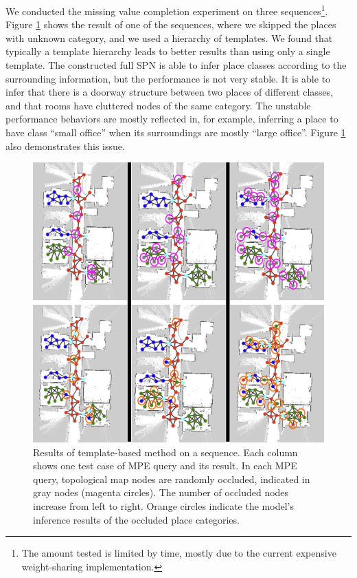 \documentclass[10pt, titlepage]{article}
\theoremstyle{definition}
\begin{document}
We conducted the missing value completion experiment on three sequences\footnote{The amount tested is limited by time, mostly due to the current expensive weight-sharing implementation.}. Figure \ref{fig:tmpl_result} shows the result of one of the sequences, where we skipped the places with unknown category, and we used a hierarchy of templates. We found that typically a template hierarchy leads to better results than using only a single template.
The constructed full SPN is able to infer place classes according to the surrounding information, but the performance is not very stable. It is able to infer that there is a doorway structure between two places of different classes, and that rooms have cluttered nodes of the same category. The unstable performance behaviors are mostly reflected in, for example, inferring a place to have class ``small office'' when its surroundings are mostly ``large office''. Figure \ref{fig:tmpl_result} also demonstrates this issue. 
\begin{figure}[!htb]
    \centering
    \captionsetup{width=.8\linewidth}
    \includegraphics[scale=0.8]{images/topo_result_multi.png}
    \caption{Results of template-based method on a sequence. Each column shows one test case of MPE query and its result. In each MPE query, topological map nodes are randomly occluded, indicated in gray nodes (magenta circles). The number of occluded nodes increase from left to right. Orange circles indicate the model's inference results of the occluded place categories.}
    \label{fig:tmpl_result}
\end{figure}
\newpage
\end{document}
